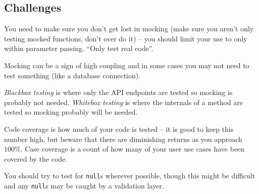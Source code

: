 \subsection{Challenges}\label{sub:challenges}

You need to make sure you don't get lost in mocking (make sure you aren't only testing mocked functions, don't over do it) -- you should limit your use to only within parameter passing.
``Only test real code''.

Mocking can be a sign of high coupling and in some cases you may not need to test something (like a database connection).

\emph{Blackbox testing} is where only the API endpoints are tested so mocking is probably not needed.
\emph{Whitebox testing} is where the internals of a method are tested so mocking probably will be needed.

Code coverage is how much of your code is tested -- it is good to keep this number high, but beware that there are diminishing returns as you approach \(100\%\).
Case coverage is a count of how many of your user use cases have been covered by the code.

You should try to test for \texttt{null}s wherever possible, though this might be difficult and any \texttt{null}s may be caught by a validation layer.
